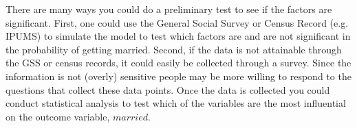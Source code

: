 \documentclass[11pt]{article}
\begin{document}
There are many ways you could do a preliminary test to see if the factors are significant. First, one could use the General Social Survey or Census Record (e.g. IPUMS) to simulate the model to test which factors are and are not significant in the probability of getting married. Second, if the data is not attainable through the GSS or census records, it could easily be collected through a survey. Since the information is not (overly) sensitive people may be more willing to respond to the questions that collect these data points. Once the data is collected you could conduct statistical analysis to test which of the variables are the most influential on the outcome variable, $married$.
\end{document}
